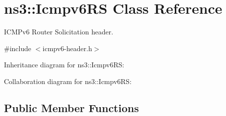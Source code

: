 \hypertarget{classns3_1_1Icmpv6RS}{}\section{ns3\+:\+:Icmpv6\+RS Class Reference}
\label{classns3_1_1Icmpv6RS}


I\+C\+M\+Pv6 Router Solicitation header.  




{\ttfamily \#include $<$icmpv6-\/header.\+h$>$}



Inheritance diagram for ns3\+:\+:Icmpv6\+RS\+:


Collaboration diagram for ns3\+:\+:Icmpv6\+RS\+:
\subsection*{Public Member Functions}
